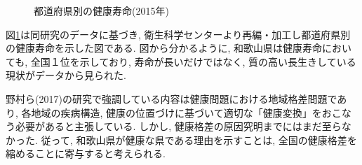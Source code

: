 %
%
%





\begin{figure}[h!]
	\begin{center}
		\caption{都道府県別の健康寿命(2015年)}\label{fig11}
	\end{center}
\end{figure}

図\ref{fig11}は同研究のデータに基づき, 衛生科学センターより再編・加工し都道府県別の健康寿命を示した図である. 図から分かるように, 和歌山県は健康寿命においても, 全国１位を示しており, 寿命が長いだけではなく, 質の高い長生きしている現状がデータから見られた.

野村ら(2017)の研究で強調している内容は健康問題における地域格差問題であり, 各地域の疾病構造, 健康の位置づけに基づいて適切な「健康変換」をおこなう必要があると主張している. しかし, 健康格差の原因究明までにはまだ至らなかった. 従って, 和歌山県が健康な県である理由を示すことは, 全国の健康格差を縮めることに寄与すると考えられる.

%

